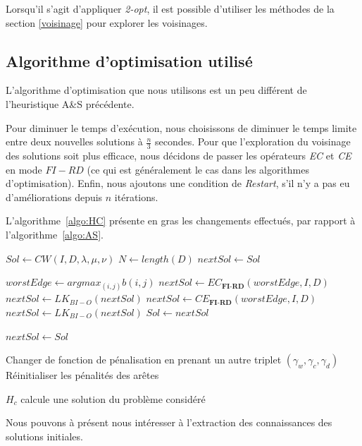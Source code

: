 \documentclass[a4paper,11pt]{article}%
\begin{document}
Lorsqu'il s'agit d'appliquer \emph{2-opt}, il est possible d'utiliser les méthodes de la section \ref{voisinage} pour explorer les voisinages.

\subsection{Algorithme d'optimisation utilisé}
L'algorithme d'optimisation que nous utilisons est un peu différent de l'heuristique A\&S précédente.

Pour diminuer le temps d'exécution, nous choisissons de diminuer le temps limite entre deux nouvelles solutions à $\frac{n}{3}$ secondes. 
Pour que l'exploration du voisinage des solutions soit plus efficace, nous décidons de passer les opérateurs \emph{EC} et \emph{CE} en mode $FI-RD$ (ce qui est généralement le cas dans les algorithmes d'optimisation).
Enfin, nous ajoutons une condition de \emph{Restart}, s'il n'y a pas eu d'améliorations depuis $n$ itérations.

L'algorithme~\ref{algo:HC} présente en gras les changements effectués, par rapport à l'algorithme~\ref{algo:AS}.

\begin{algorithm}
\DontPrintSemicolon %
$Sol \gets CW(I,D,\lambda,\mu,\nu)$\;
$N \gets length(D)$\;
$nextSol \gets Sol$\;
 {
	$worstEdge \gets argmax_{(i,j)} b(i,j) $\;
	$nextSol \gets EC_{\textbf{FI-RD}}(worstEdge,I,D)$\;
	$nextSol \gets LK_{BI-O}(nextSol)$\;
	$nextSol \gets CE_{\textbf{FI-RD}}(worstEdge,I,D)$\;
	$nextSol \gets LK_{BI-O}(nextSol)$\;
	 {
		$ Sol \gets nextSol$\;
	}
	
	 {
		$nextSol \gets Sol$\;
	
	}
	
	 {
		Changer de fonction de pénalisation en prenant un autre triplet $(\gamma_w,\gamma_c,\gamma_d)$\;
		Réinitialiser les pénalités des arêtes\;
	}
	
}
\;
\caption{{\sc $H_c$} calcule une solution du problème considéré}
\label{algo:HC}
\end{algorithm}

Nous pouvons à présent nous intéresser à l'extraction des connaissances des solutions initiales.
\end{document}
